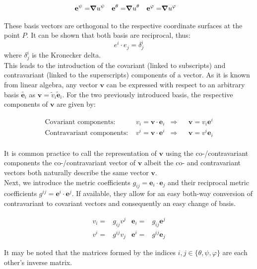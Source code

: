 \begin{align}
	\mathbf{e}^\psi = & \grad{u^\psi} & \mathbf{e}^\theta = & \grad{u^\theta} & \mathbf{e}^\varphi = & \grad{u^\varphi}
\end{align}

These basis vectors are orthogonal to the respective coordinate surfaces at the point $P$. It can be shown that both basis are reciprocal, thus:
$$ e^i\cdot e_j = \delta^i_j $$
where $\delta^i_j$ is the Kronecker delta. \\
This leads to the introduction of the covariant (linked to subscripts) and contravariant (linked to the superscripts) components of a vector. As it is known from linear algebra, any vector $\mathbf{v}$ can be expressed with respect to an arbitrary basis $\tilde{\mathbf{e}_i}$ as $\mathbf{v}=\tilde{v}_i\tilde{\mathbf{e}}_i$. For the two previously introduced basis, the respective components of $\mathbf{v}$ are given by: 

\begin{align}
	\text{Covariant components: }    & v_i = \mathbf{v}\cdot\mathbf{e}_i & \Rightarrow && \mathbf{v} = v_i\mathbf{e}^i \\
	\text{Contravariant components: }& v^i = \mathbf{v}\cdot\mathbf{e}^i & \Rightarrow && \mathbf{v} = v^i\mathbf{e}_i \\
\end{align}

It is common practice to call the representation of $\mathbf{v}$ using the co-/contravariant components the co-/contravariant vector of $\mathbf{v}$ albeit the co- and contravariant vectors both naturally describe the same vector $\mathbf{v}$. \\
Next, we introduce the metric coefficients $g_{ij} = \mathbf{e}_i\cdot \mathbf{e}_j$ and their reciprocal metric coefficients $g^{ij} = \mathbf{e}^i\cdot \mathbf{e}^j$. If available, they allow for an easy both-way conversion of contravariant to covariant vectors and consequently an easy change of basis. 

\begin{align}
	v_i =& g_{ij}v^j & \mathbf{e}_i =& g_{ij}\mathbf{e}^j \\
	v^i =& g^{ij}v_j & \mathbf{e}^i =& g^{ij}\mathbf{e}_j 
\end{align}

It may be noted that the matrices formed by the indices $i,j\in\{\theta,\psi,\varphi\}$ are each other's inverse matrix. \\



